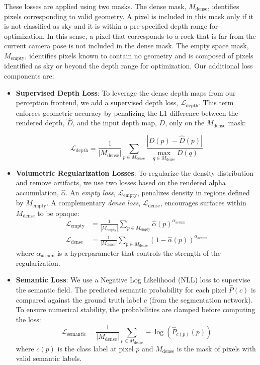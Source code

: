 These losses are applied using two masks. The dense mask, $M_{\text{dense}}$, identifies pixels corresponding to valid geometry. A pixel is included in this mask only if it is not classified as sky and it is within a pre-specified depth range for optimization.
In this sense, a pixel that corresponds to a rock that is far from the current camera pose is not included in the dense mask.
The empty space mask, $M_{\text{empty}}$, identifies pixels known to contain no geometry and is composed of pixels identified as sky or beyond the depth range for optimization.
Our additional loss components are:
\begin{itemize}
	\item \textbf{Supervised Depth Loss}: To leverage the dense depth maps from our perception frontend, we add a supervised depth loss, $\mathcal{L}_{\text{depth}}$. This term enforces geometric accuracy by penalizing the L1 difference between the rendered depth, $\hat{D}$, and the input depth map, $D$, only on the $M_{\text{dense}}$ mask:

	      \begin{equation}
		      \mathcal{L}_{\text{depth}} = \frac{1}{|M_{\text{dense}}|} \sum_{p \in M_{\text{dense}}} \frac{|D(p) - \hat{D}(p)|}{\max_{q \in M_{\text{dense}}} D(q)}
	      \end{equation}

	\item \textbf{Volumetric Regularization Losses}: To regularize the density distribution and remove artifacts, we use two losses based on the rendered alpha accumulation, $\hat{\alpha}$. An \textit{empty loss}, $\mathcal{L}_{\text{empty}}$, penalizes density in regions defined by $M_{\text{empty}}$. A complementary \textit{dense loss}, $\mathcal{L}_{\text{dense}}$, encourages surfaces within $M_{\text{dense}}$ to be opaque:
	      \begin{align}
		      \mathcal{L}_{\text{empty}} & = \frac{1}{|M_{\text{empty}}|} \sum_{p \in M_{\text{empty}}} \hat{\alpha}(p)^{\alpha_{\text{accum}}}       \\
		      \mathcal{L}_{\text{dense}} & = \frac{1}{|M_{\text{dense}}|} \sum_{p \in M_{\text{dense}}} (1 - \hat{\alpha}(p))^{\alpha_{\text{accum}}}
	      \end{align}
	      where $\alpha_{\text{accum}}$ is a hyperparameter that controls the strength of the regularization.

	\item \textbf{Semantic Loss}: We use a Negative Log Likelihood (NLL) loss to supervise the semantic field. The predicted semantic probability for each pixel $\hat{P}(c)$ is compared against the ground truth label $c$ (from the segmentation network). To ensure numerical stability, the probabilities are clamped before computing the loss:
	      \begin{equation}
		      \mathcal{L}_{\text{semantic}} = \frac{1}{|M_{\text{dense}}|} \sum_{p \in M_{\text{dense}}} - \log(\hat{P}_{c(p)}(p))
	      \end{equation}
	      where $c(p)$ is the class label at pixel $p$ and $M_{\text{dense}}$ is the mask of pixels with valid semantic labels.
\end{itemize}

